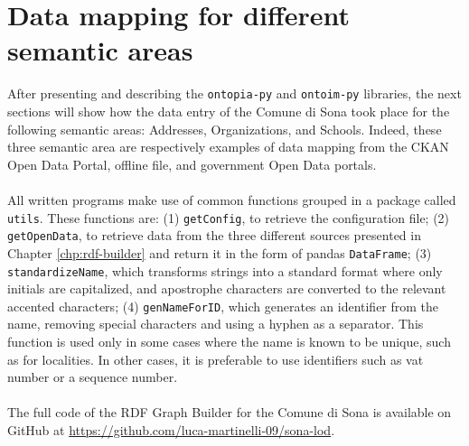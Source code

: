 \section{Data mapping for different semantic areas}
\label{sec:workflows-sas}

After presenting and describing the \verb#ontopia-py# and \verb#ontoim-py# libraries, the next sections will show how the data entry of the Comune di Sona took place for the following semantic areas: Addresses, Organizations, and Schools. Indeed, these three semantic area are respectively examples of data mapping from the CKAN Open Data Portal, offline file, and government Open Data portals.

\paragraph*{}
All written programs make use of common functions grouped in a package called \verb#utils#. These functions are: (1) \verb#getConfig#, to retrieve the configuration file; (2) \verb#getOpenData#, to retrieve data from the three different sources presented in Chapter \ref{chp:rdf-builder} and return it in the form of pandas \verb#DataFrame#; (3) \verb#standardizeName#, which transforms strings into a standard format where only initials are capitalized, and apostrophe characters are converted to the relevant accented characters; (4) \verb#genNameForID#, which generates an identifier from the name, removing special characters and using a hyphen as a separator. This function is used only in some cases where the name is known to be unique, such as for localities. In other cases, it is preferable to use identifiers such as vat number or a sequence number.

\paragraph*{}
The full code of the \ac{RDF} Graph Builder for the Comune di Sona is available on GitHub at \url{https://github.com/luca-martinelli-09/sona-lod}.

